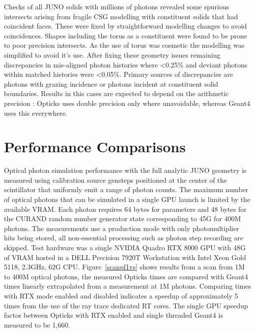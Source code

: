\documentclass{webofc}
\begin{document}
Checks of all JUNO solids with millions of photons revealed some spurious intersects  
arising from fragile CSG modelling with constituent solids that had coincident faces.  
These were fixed by straightforward modelling changes to avoid coincidences. 
Shapes including the torus as a constituent were found to be prone to poor precision intersects. 
As the use of torus was cosmetic the modelling was simplified to avoid it's use.  
After fixing these geometry issues remaining discrepancies in mis-aligned photon histories
where <0.25\% and deviant photons within matched histories were <0.05\%. 
Primary sources of discrepancies are photons with grazing incidence or photons incident
at constituent solid boundaries. Results in this cases are expected to depend on the arithmetic precision : Opticks uses double precision 
only where unavoidable, whereas Geant4 uses this everywhere. 
%
%
\section{Performance Comparisons}

Optical photon simulation performance with the full analytic JUNO geometry is measured 
using calibration source gensteps positioned at the center of the scintillator 
that uniformly emit a range of photon counts. 
The maximum number of optical photons that can be simulated in a single GPU launch is
limited by the available VRAM. Each photon requires 64 bytes for parameters  
and 48 bytes for the CURAND random number generator state corresponding to 45G for 400M photons.
The measurements use a production mode with only photomultiplier hits being stored, 
all non-essential processing such as photon step recording are skipped. Test hardware was a single 
NVIDIA Quadro RTX 8000 GPU with 48G of VRAM hosted in a DELL Precision 7920T Workstation with 
Intel Xeon Gold 5118, 2.3GHz, 62G CPU. 
Figure~\ref{scanpf1vs} shows results from a scan from 1M to 400M optical photons, the measured Opticks 
times are compared with Geant4 times linearly extrapolated from a measurement at 1M photons. 
Comparing times with RTX mode enabled and disabled indicates a speedup of approximately 5 times
from the use of the ray trace dedicated RT cores.
The single GPU speedup factor between Opticks with RTX enabled and single threaded Geant4 
is measured to be 1,660.   
\end{document}

